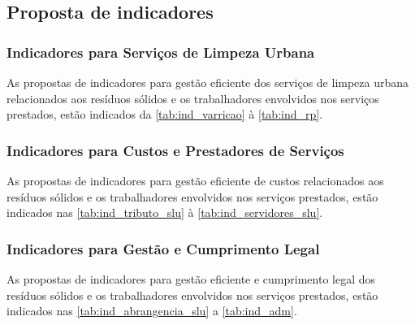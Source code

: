 \subsection{Proposta de indicadores}
\subsubsection{Indicadores para Serviços de Limpeza Urbana }
As propostas de indicadores para gestão eficiente dos serviços de limpeza urbana relacionados aos resíduos sólidos e os trabalhadores envolvidos nos serviços prestados, estão indicados da \autoref{tab:ind_varricao} à \autoref{tab:ind_rp}.

























\subsubsection{Indicadores para Custos e Prestadores de Serviços}
As propostas de indicadores para gestão eficiente de custos relacionados aos resíduos sólidos e os trabalhadores envolvidos nos serviços prestados, estão indicados nas \autoref{tab:ind_tributo_slu} à \autoref{tab:ind_servidores_slu}.







\subsubsection{Indicadores para Gestão e Cumprimento Legal }
As propostas de indicadores para gestão eficiente e cumprimento legal dos resíduos sólidos e os trabalhadores envolvidos nos serviços prestados, estão indicados nas \autoref{tab:ind_abrangencia_slu} a \autoref{tab:ind_adm}.

